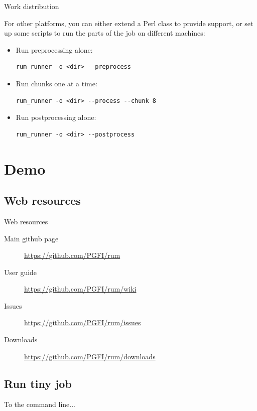 \documentclass{beamer}
\begin{document}
\begin{frame}[fragile]{Work distribution}

For other platforms, you can either extend a Perl class to provide
support, or set up some scripts to run the parts of the job on
different machines:

\pause

\begin{itemize}
\item  Run preprocessing alone:

\begin{verbatim}
rum_runner -o <dir> --preprocess
\end{verbatim}

\pause

\item Run chunks one at a time:

\begin{verbatim}
rum_runner -o <dir> --process --chunk 8
\end{verbatim}

\pause

\item Run postprocessing alone:

\begin{verbatim}
rum_runner -o <dir> --postprocess
\end{verbatim}

\end{itemize}

\end{frame}


\section{Demo}

\subsection{Web resources}

\begin{frame}{Web resources}
  \begin{description}
    \item [Main github page] 
      \url{https://github.com/PGFI/rum}

    \item [User guide] 
      \url{https://github.com/PGFI/rum/wiki}

    \item [Issues] 
      \url{https://github.com/PGFI/rum/issues}

    \item [Downloads] 
      \url{https://github.com/PGFI/rum/downloads}
    
  \end{description}
\end{frame}

\subsection{Run tiny job}

\begin{frame}
  To the command line...
\end{frame}
\end{document}
